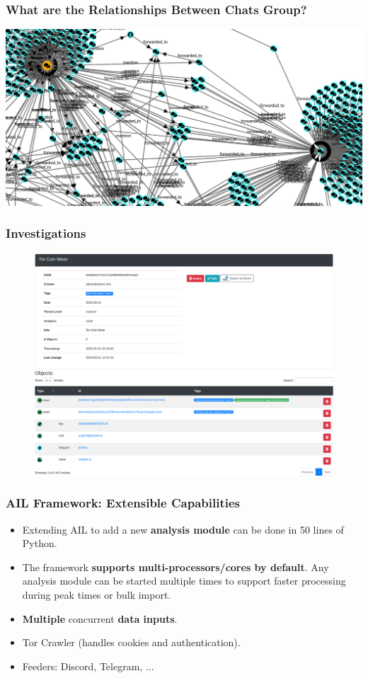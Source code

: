 \documentclass{beamer}
\begin{document}
\begin{frame}
    \frametitle{What are the Relationships Between Chats Group?}
    \begin{center}
        \includegraphics[scale=0.27]{screenshot/noname-relationships.png}
    \end{center}
\end{frame}

\begin{frame}
    \frametitle{Investigations}
    \begin{figure}
        \includegraphics[scale=0.22, angle=0]{screenshot/investigation_mixer.png}
    \end{figure}
\end{frame}

\begin{frame}
    \frametitle{AIL Framework: Extensible Capabilities}
    \begin{itemize}
        \item Extending AIL to add a new \textbf{analysis module} can be done in 50 lines of Python.
        \item The framework \textbf{supports multi-processors/cores by default}. Any analysis module can be started multiple times to support faster processing during peak times or bulk import.
        \item \textbf{Multiple} concurrent \textbf{data inputs}.
        \item Tor Crawler (handles cookies and authentication).
        \item Feeders: Discord, Telegram, ...
    \end{itemize}
\end{frame}
\end{document}
